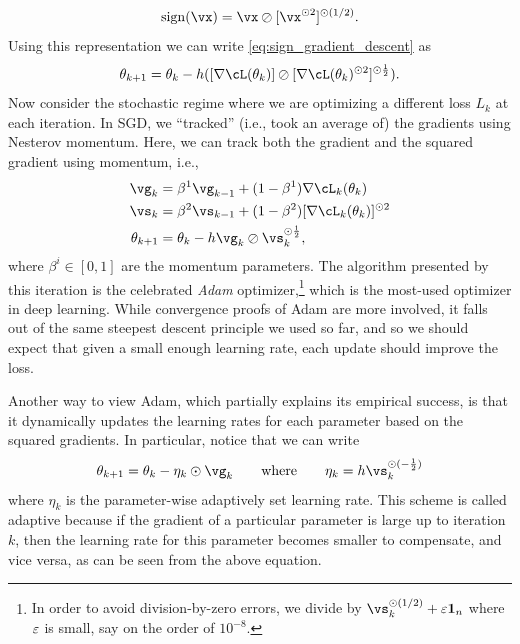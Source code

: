 \documentclass[../../book-main.tex]{subfiles}
\begin{document}
\begin{equation}
    \sign(\vx) = \vx \oslash [\vx^{\odot 2}]^{\odot (1/2)}.
\end{equation}
Using this representation we can write \eqref{eq:sign_gradient_descent} as 
\begin{equation}
    \theta_{k + 1} = \theta_{k} - h ([\nabla \cL(\theta_{k})] \oslash [\nabla \cL(\theta_{k})^{\odot 2}]^{\odot \frac{1}{2}}).
\end{equation}
Now consider the stochastic regime where we are optimizing a different loss \(L_{k}\) at each iteration. In SGD, we ``tracked'' (i.e., took an average of) the gradients using Nesterov momentum. Here, we can track both the gradient and the squared gradient using momentum, i.e.,
\begin{align}
    \vg_{k}
    &= \beta^{1}\vg_{k - 1} + (1 - \beta^{1})\nabla \cL_{k}(\theta_{k}) \\ 
    \vs_{k}
    &= \beta^{2}\vs_{k - 1} + (1 - \beta^{2})[\nabla \cL_{k}(\theta_{k})]^{\odot 2}  \\
    \theta_{k + 1}
    &= \theta_{k} - h\vg_{k}\oslash\vs_{k}^{\odot \frac{1}{2}},
\end{align}
where \(\beta^{i} \in [0, 1]\) are the momentum parameters. The algorithm presented by this iteration is the celebrated \textit{Adam} optimizer,\footnote{In order to avoid division-by-zero errors, we divide by \(\vs_{k}^{\odot (1/2)} + \eps \vone_{n}\) where \(\varepsilon\) is small, say on the order of \(10^{-8}\).} which is the most-used optimizer in deep learning. While convergence proofs of Adam are more involved, it falls out of the same steepest descent principle we used so far, and so we should expect that given a small enough learning rate, each update should improve the loss.

Another way to view Adam, which partially explains its empirical success, is that it dynamically updates the learning rates for each parameter based on the squared gradients. In particular, notice that we can write
\begin{equation}
    \theta_{k + 1} = \theta_{k} - \eta_{k} \odot \vg_{k} \qquad \text{where} \qquad \eta_{k} = h \vs_{k}^{\odot (-\frac{1}{2})}
\end{equation}
where \(\eta_{k}\) is the parameter-wise adaptively set learning rate. This scheme is called adaptive because if the gradient of a particular parameter is large up to iteration \(k\), then the learning rate for this parameter becomes smaller to compensate, and vice versa, as can be seen from the above equation.
\end{document}
